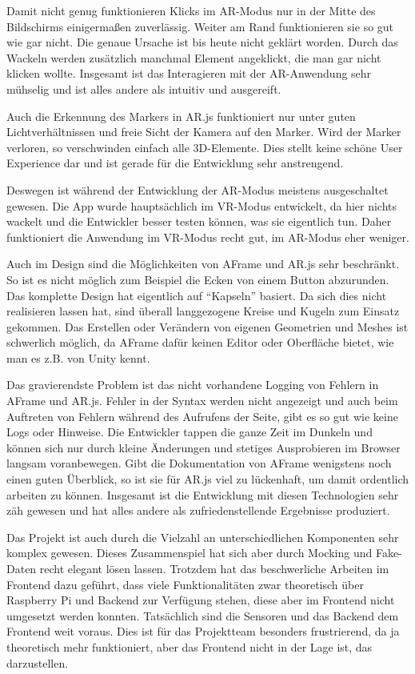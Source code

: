 Damit nicht genug funktionieren Klicks im AR-Modus nur in der Mitte des
Bildschirms einigermaßen zuverlässig. Weiter am Rand funktionieren sie
so gut wie gar nicht. Die genaue Ursache ist bis heute nicht geklärt
worden. Durch das Wackeln werden zusätzlich manchmal Element angeklickt,
die man gar nicht klicken wollte. Insgesamt ist das Interagieren mit der
AR-Anwendung sehr mühselig und ist alles andere als intuitiv und
ausgereift.

Auch die Erkennung des Markers in AR.js funktioniert nur unter guten
Lichtverhältnissen und freie Sicht der Kamera auf den Marker. Wird der
Marker verloren, so verschwinden einfach alle 3D-Elemente. Dies stellt
keine schöne User Experience dar und ist gerade für die Entwicklung sehr
anstrengend.

Deswegen ist während der Entwicklung der AR-Modus meistens ausgeschaltet
gewesen. Die App wurde hauptsächlich im VR-Modus entwickelt, da hier
nichts wackelt und die Entwickler besser testen können, was sie
eigentlich tun. Daher funktioniert die Anwendung im VR-Modus recht gut,
im AR-Modus eher weniger.

Auch im Design sind die Möglichkeiten von AFrame und AR.js sehr
beschränkt. So ist es nicht möglich zum Beispiel die Ecken von einem
Button abzurunden. Das komplette Design hat eigentlich auf ``Kapseln''
basiert. Da sich dies nicht realisieren lassen hat, sind überall
langgezogene Kreise und Kugeln zum Einsatz gekommen. Das Erstellen oder
Verändern von eigenen Geometrien und Meshes ist schwerlich möglich, da
AFrame dafür keinen Editor oder Oberfläche bietet, wie man es z.B. von
Unity kennt.

Das gravierendste Problem ist das nicht vorhandene Logging von Fehlern
in AFrame und AR.js. Fehler in der Syntax werden nicht angezeigt und
auch beim Auftreten von Fehlern während des Aufrufens der Seite, gibt es
so gut wie keine Logs oder Hinweise. Die Entwickler tappen die ganze
Zeit im Dunkeln und können sich nur durch kleine Änderungen und stetiges
Ausprobieren im Browser langsam voranbewegen. Gibt die Dokumentation von
AFrame wenigstens noch einen guten Überblick, so ist sie für AR.js viel
zu lückenhaft, um damit ordentlich arbeiten zu können. Insgesamt ist die
Entwicklung mit diesen Technologien sehr zäh gewesen und hat alles
andere als zufriedenstellende Ergebnisse produziert.

Das Projekt ist auch durch die Vielzahl an unterschiedlichen Komponenten
sehr komplex gewesen. Dieses Zusammenspiel hat sich aber durch Mocking
und Fake-Daten recht elegant lösen lassen. Trotzdem hat das
beschwerliche Arbeiten im Frontend dazu geführt, dass viele
Funktionalitäten zwar theoretisch über Raspberry Pi und Backend zur
Verfügung stehen, diese aber im Frontend nicht umgesetzt werden konnten.
Tatsächlich sind die Sensoren und das Backend dem Frontend weit voraus.
Dies ist für das Projektteam besonders frustrierend, da ja theoretisch
mehr funktioniert, aber das Frontend nicht in der Lage ist, das
darzustellen.

